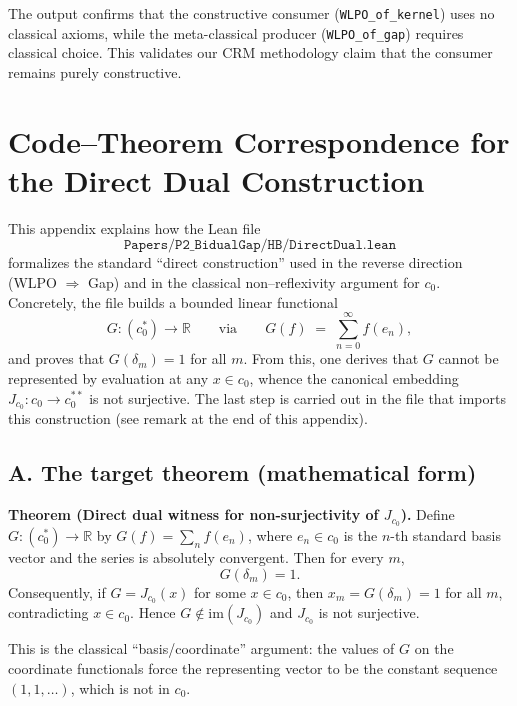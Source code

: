 \documentclass[11pt]{article}
\begin{document}
The output confirms that the constructive consumer (\texttt{WLPO\_of\_kernel}) uses no classical axioms, while the meta-classical producer (\texttt{WLPO\_of\_gap}) requires classical choice. This validates our CRM methodology claim that the consumer remains purely constructive.

\section{Code--Theorem Correspondence for the Direct Dual Construction}
\label{app:DirectDualCorrespondence}

This appendix explains how the Lean file
\[
\texttt{Papers/P2\_BidualGap/HB/DirectDual.lean}
\]
formalizes the standard ``direct construction'' used in the reverse direction (WLPO $\Rightarrow$ Gap) and in the classical non--reflexivity argument for $c_0$. Concretely, the file builds a bounded linear functional
\[
G : (c_0^\ast) \to \mathbb R
\qquad\text{via}\qquad
G(f)\;=\;\sum_{n=0}^\infty f(e_n),
\]
and proves that $G(\delta_m)=1$ for all $m$. From this, one derives that $G$ cannot be represented by evaluation at any $x\in c_0$, whence the canonical embedding $J_{c_0}:c_0\to c_0^{\ast\ast}$ is not surjective. The last step is carried out in the file that imports this construction (see remark at the end of this appendix).

\subsection*{A. The target theorem (mathematical form)}

\begin{mdframed}[backgroundcolor=gray!5,linewidth=0pt]
\textbf{Theorem (Direct dual witness for non-surjectivity of $J_{c_0}$).}
Define $G:(c_0^\ast)\to\mathbb{R}$ by $G(f)=\sum_{n} f(e_n)$, where $e_n\in c_0$ is the $n$-th standard basis vector and the series is absolutely convergent. Then for every $m$,
\[
G(\delta_m)=1.
\]
Consequently, if $G=J_{c_0}(x)$ for some $x\in c_0$, then $x_m=G(\delta_m)=1$ for all $m$, contradicting $x\in c_0$. Hence $G\notin \mathrm{im}(J_{c_0})$ and $J_{c_0}$ is not surjective.
\end{mdframed}

This is the classical ``basis/coordinate'' argument: the values of $G$ on the coordinate functionals force the representing vector to be the constant sequence $(1,1,\dots)$, which is not in $c_0$.
\end{document}
